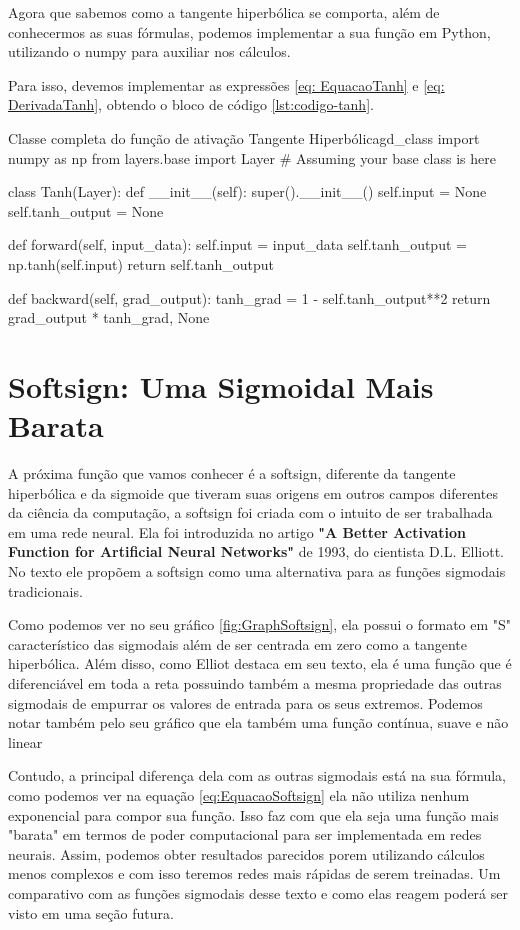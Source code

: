 Agora que sabemos como a tangente hiperbólica se comporta, além de conhecermos as suas fórmulas, podemos implementar a sua função em Python, utilizando o numpy para auxiliar nos cálculos.

Para isso, devemos implementar as expressões \ref{eq: EquacaoTanh} e \ref{eq: DerivadaTanh}, obtendo o bloco de código \ref{lst:codigo-tanh}.

\begin{codelisting}{Classe completa do função de ativação Tangente Hiperbólica}{gd_class}
import numpy as np
from layers.base import Layer  # Assuming your base class is here

class Tanh(Layer):
    def __init__(self):
        super().__init__()
        self.input = None
        self.tanh_output = None

    def forward(self, input_data):
        self.input = input_data
        self.tanh_output = np.tanh(self.input)
        return self.tanh_output

    def backward(self, grad_output):
        tanh_grad = 1 - self.tanh_output**2
        return grad_output * tanh_grad, None
\end{codelisting}

\section{Softsign: Uma Sigmoidal Mais Barata}

A próxima função que vamos conhecer é a softsign, diferente da tangente hiperbólica e da sigmoide que tiveram suas origens em outros campos diferentes da ciência da computação, a softsign foi criada com o intuito de ser trabalhada em uma rede neural. Ela foi introduzida no artigo \textbf{"A Better Activation Function for Artificial Neural Networks"} de 1993, do cientista D.L. Elliott. No texto ele propõem a softsign como uma alternativa para as funções sigmodais tradicionais.

Como podemos ver no seu gráfico \ref{fig:GraphSoftsign}, ela possui o formato em "S" característico das sigmodais além de ser centrada em zero como a tangente hiperbólica. Além disso, como Elliot destaca em seu texto, ela é uma função que é diferenciável em toda a reta possuindo também a mesma propriedade das outras sigmodais de empurrar os valores de entrada para os seus extremos. Podemos notar também pelo seu gráfico que ela também uma função contínua, suave e não linear

Contudo, a principal diferença dela com as outras sigmodais está na sua fórmula, como podemos ver na equação \ref{eq:EquacaoSoftsign} ela não utiliza nenhum exponencial para compor sua função. Isso faz com que ela seja uma função mais "barata" em termos de poder computacional para ser implementada em redes neurais. Assim, podemos obter resultados parecidos porem utilizando cálculos menos complexos e com isso teremos redes mais rápidas de serem treinadas. Um comparativo com as funções sigmodais desse texto e como elas reagem poderá ser visto em uma seção futura.

